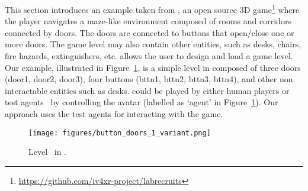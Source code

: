 
This section introduces an example taken from \sut, an open source 3D game\footnote{\url{https://github.com/iv4xr-project/labrecruits}} where the player navigates a maze-like environment composed of rooms and corridors connected by doors. The doors are connected to buttons that open/close one or more doors. 
The game level may also contain other entities, such as 
desks, chairs, fire hazards, extinguishers, etc. \sut allows the user to design and load a game level. Our example, illustrated in Figure~\ref{fig:runningexample}, is a simple level in \sut composed of three doors (door1, door2, door3), four buttons (bttn1, bttn2, bttn3, bttn4), and other non interactable entities such as desks. \sut could be played by either human players or test agents~\cite{prasetya2020aplib} by controlling the avatar (labelled as `agent' in Figure~\ref{fig:runningexample}). Our approach uses the test agents for interacting with the game.


\begin{figure}[tb]
    \begin{center}
    \texttt{[image: figures/button\_doors\_1\_variant.png]}
    \end{center}
    \caption{Level \buttonsdoors~in \sut.} 
    \label{fig:runningexample}
\end{figure}